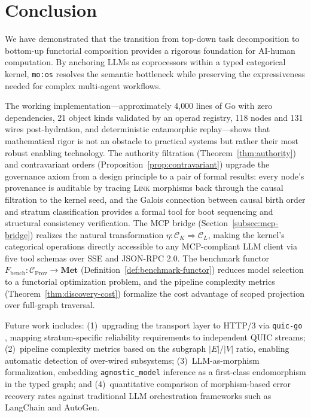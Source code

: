 \documentclass[submission,copyright,creativecommons]{eptcs}
\begin{document}
\section{Conclusion}
\label{sec:conclusion}

We have demonstrated that the transition from top-down task decomposition to
bottom-up functorial composition provides a rigorous foundation for
AI-human computation. By anchoring LLMs as coprocessors within a typed
categorical kernel, \texttt{mo:os} resolves the semantic bottleneck while
preserving the expressiveness needed for complex multi-agent workflows.

The working implementation---approximately 4{,}000 lines of Go with zero
dependencies, 21 object kinds validated by an operad registry, 118 nodes and
131 wires post-hydration, and deterministic catamorphic replay---shows that
mathematical rigor is not an obstacle to practical systems but rather their
most robust enabling technology.
The authority filtration (Theorem~\ref{thm:authority}) and contravariant
orders (Proposition~\ref{prop:contravariant}) upgrade the governance axiom
from a design principle to a pair of formal results: every node's provenance
is auditable by tracing \textsc{Link} morphisms back through the causal
filtration to the kernel seed, and the Galois connection between causal birth
order and stratum classification provides a formal tool for boot sequencing
and structural consistency verification.
The MCP bridge (Section~\ref{subsec:mcp-bridge}) realizes the natural
transformation $\eta\colon \mathcal{C}_K \Rightarrow \mathcal{C}_L$, making
the kernel's categorical operations directly accessible to any MCP-compliant
LLM client via five tool schemas over SSE and JSON-RPC 2.0. The benchmark
functor $F_{\mathrm{bench}}\colon \mathcal{C}_{\mathrm{Prov}} \to
\mathbf{Met}$ (Definition~\ref{def:benchmark-functor}) reduces model selection
to a functorial optimization problem, and the pipeline complexity metrics
(Theorem~\ref{thm:discovery-cost}) formalize the cost advantage of scoped
projection over full-graph traversal.

Future work includes:
(1)~upgrading the transport layer to HTTP/3 via \texttt{quic-go}
\cite{rfc9114}, mapping stratum-specific reliability requirements to
independent QUIC streams;
(2)~pipeline complexity metrics based on the subgraph $|E|/|V|$ ratio,
enabling automatic detection of over-wired subsystems;
(3)~LLM-as-morphism formalization, embedding \texttt{agnostic\_model} inference
as a first-class endomorphism in the typed graph;
and (4)~quantitative comparison of morphism-based error recovery rates against
traditional LLM orchestration frameworks such as LangChain and AutoGen.



\end{document}
